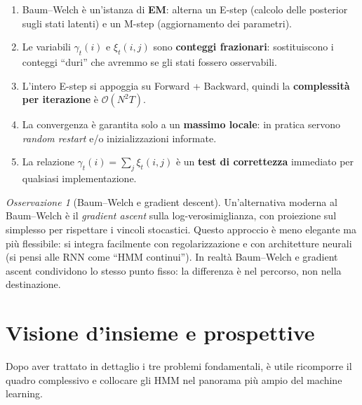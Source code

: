 \documentclass[11pt,a4paper,oneside]{book}
\theoremstyle{plain}
\theoremstyle{definition}
\theoremstyle{remark}
\newtheorem{osservazione}[teorema]{Osservazione}
\newcommand{\Nstates}{N}                     %
\newcommand{\Tlen}{T}                        %
\newcommand{\gam}{\gamma}                    %
\newcommand{\xig}{\xi}                       %
\begin{document}
\begin{tcolorbox}[insightbox,title=Takeaway -- Capitolo 5]
\begin{enumerate}[leftmargin=*]
    \item Baum--Welch è un'istanza di \textbf{EM}: alterna
          un E-step (calcolo delle posterior sugli stati latenti)
          e un M-step (aggiornamento dei parametri).
    \item Le variabili $\gam_t(i)$ e $\xig_t(i,j)$ sono
          \textbf{conteggi frazionari}: sostituiscono i conteggi
          ``duri'' che avremmo se gli stati fossero osservabili.
    \item L'intero E-step si appoggia su Forward + Backward,
          quindi la \textbf{complessità per iterazione} è
          $\mathcal{O}(\Nstates^2\Tlen)$.
    \item La convergenza è garantita solo a un \textbf{massimo
          locale}: in pratica servono \emph{random restart} e/o
          inizializzazioni informate.
    \item La relazione $\gam_t(i)=\sum_j \xig_t(i,j)$ è un
          \textbf{test di correttezza} immediato per qualsiasi
          implementazione.
\end{enumerate}
\end{tcolorbox}

\begin{osservazione}[Baum--Welch e gradient descent]
Un'alternativa moderna al Baum--Welch è il \emph{gradient ascent}
sulla log-verosimiglianza, con proiezione sul simplesso per rispettare
i vincoli stocastici. Questo approccio è meno elegante ma più
flessibile: si integra facilmente con regolarizzazione e con
architetture neurali (si pensi alle RNN come ``HMM continui''). In
realtà Baum--Welch e gradient ascent condividono lo stesso punto
fisso: la differenza è nel percorso, non nella destinazione.
\end{osservazione}

\chapter{Visione d'insieme e prospettive}
\label{ch:conclusioni}

Dopo aver trattato in dettaglio i tre problemi fondamentali, è utile
ricomporre il quadro complessivo e collocare gli HMM nel panorama più
ampio del machine learning.
\end{document}
